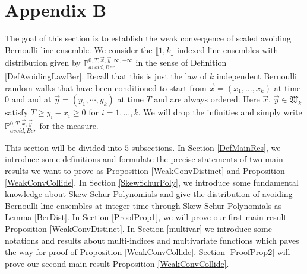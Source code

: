 %
\section{Appendix B} \label{Section9}

The goal of this section is to establish the weak convergence of scaled avoiding Bernoulli line ensemble. We consider the $\llbracket 1,k\rrbracket$-indexed line ensembles with distribution given by $\mathbb{P}^{0,T,\vec{x},\vec{y},\infty,-\infty}_{avoid,Ber}$ in the sense of Definition \ref{DefAvoidingLawBer}. Recall that this is just the law of $k$ independent Bernoulli random walks that have been conditioned to start from $\vec{x}=(x_{1},\dots,x_{k})$ at time $0$ and and at $\vec{y}=(y_1,\cdots,y_{k})$ at time $T$ and are always ordered. Here $\vec{x}$, $\vec{y}\in\mathfrak{W}_{k}$ satisfy $T\geq y_{i}-x_{i}\geq 0$ for $i=1,\dots,k$. We will drop the infinities and simply write $\mathbb{P}^{0,T,\vec{x},\vec{y}}_{avoid,Ber}$ for the measure.

This section will be divided into $5$ subsections. In Section \ref{DefMainRes}, we introduce some definitions and formulate the precise statements of two main results we want to prove as Proposition \ref{WeakConvDistinct} and Proposition \ref{WeakConvCollide}. In Section \ref{SkewSchurPoly}, we introduce some fundamental knowledge about Skew Schur Polynomials and give the distribution of avoiding Bernoulli line ensembles at integer time through Skew Schur Polynomials as Lemma \ref{BerDist}. In Section \ref{ProofProp1}, we will prove our first main result Proposition \ref{WeakConvDistinct}. In Section \ref{multivar} we introduce some notations and results about multi-indices and multivariate functions which paves the way for proof of Proposition \ref{WeakConvCollide}. Section \ref{ProofProp2} will prove our second main result Proposition \ref{WeakConvCollide}.

